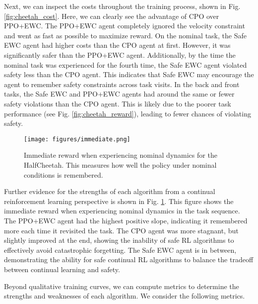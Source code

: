 Next, we can inspect the costs throughout the training process, shown in Fig. \ref{fig:cheetah_cost}. Here, we can clearly see the advantage of CPO over PPO+EWC. The PPO+EWC agent completely ignored the velocity constraint and went as fast as possible to maximize reward. On the nominal task, the Safe EWC agent had higher costs than the CPO agent at first. However, it was significantly safer than the PPO+EWC agent. Additionally, by the time the nominal task was experienced for the fourth time, the Safe EWC agent violated safety less than the CPO agent. This indicates that Safe EWC may encourage the agent to remember safety constraints across task visits. In the back and front tasks, the Safe EWC and PPO+EWC agents had around the same or fewer safety violations than the CPO agent. This is likely due to the poorer task performance (see Fig. \ref{fig:cheetah_reward}), leading to fewer chances of violating safety.

\begin{figure}
    \centering
    \texttt{[image: figures/immediate.png]}
    \caption{Immediate reward when experiencing nominal dynamics for the HalfCheetah. This measures how well the policy under nominal conditions is remembered.}
    \label{fig:immediate_reward}
\end{figure}

Further evidence for the strengths of each algorithm from a continual reinforcement learning perspective is shown in Fig. \ref{fig:immediate_reward}. This figure shows the immediate reward when experiencing nominal dynamics in the task sequence. The PPO+EWC agent had the highest positive slope, indicating it remembered more each time it revisited the task. The CPO agent was more stagnant, but slightly improved at the end, showing the inability of safe RL algorithms to effectively avoid catastrophic forgetting. The Safe EWC agent is in between, demonstrating the ability for safe continual RL algorithms to balance the tradeoff between continual learning and safety.

Beyond qualitative training curves, we can compute metrics to determine the strengths and weaknesses of each algorithm. We consider the following metrics.

